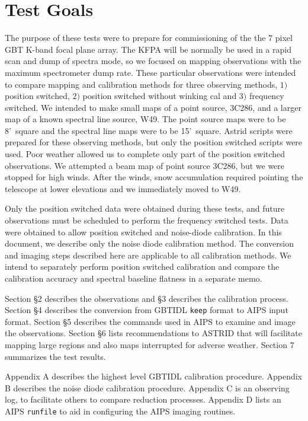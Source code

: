 \documentclass[12pt,twoside]{article}
\newcommand{\arcm}{'~}
\begin{document}
\section{Test Goals}
The purpose of these tests were to prepare for commissioning of the the 7 pixel GBT
K-band focal plane array.   The KFPA will be normally be used in a rapid scan and 
dump of spectra mode, so we focused on mapping observations 
with the maximum spectrometer
dump rate.
These particular observations were intended to compare mapping and calibration 
methods for three observing methods, $1)$ position switched,
$2)$ position switched without winking cal and
$3)$ frequency switched.
We intended to make small maps of a point source, 3C286, and a larger map
of a known spectral line source, W49.   The point source maps were to be
8\arcm square and the spectral line maps were to be 15\arcm square.
Astrid scripts were prepared for these observing methods, but only
the position switched scripts were used. 
Poor weather allowed us to complete only part of the position switched observations.
We attempted a beam map of point source 3C286, 
but we were stopped for high winds.   After the winds,
snow accumulation required pointing the telescope
at lower elevations and we immediately moved to W49.

Only the position switched data were obtained during these tests, and future observations
must be scheduled to perform the frequency switched tests.
Data were obtained to allow position switched and noise-diode calibration.
In this document, we describe only the noise diode calibration method.
The conversion and imaging steps described here are applicable to all
calibration methods.
We intend to separately perform position switched calibration and compare
the calibration accuracy and spectral baseline flatness in a separate memo.

Section \S 2 describes the observations and \S 3 describes the calibration process.
Section \S 4 describes the conversion from GBTIDL {\tt keep} format to AIPS input
format. 
Section \S 5 describes the commands used in AIPS to examine and image the
observations.   Section \S 6 lists recommendations to ASTRID that will facilitate
mapping large regions and also maps interrupted for adverse weather.
Section 7 summarizes the test results.

Appendix A describes the highest level GBTIDL calibration procedure.   Appendix
B describes the noise diode calibration procedure.  Appendix C is an observing
log, to facilitate others to compare reduction processes.
Appendix D lists an AIPS {\tt runfile} to aid in configuring the AIPS imaging routines.
\end{document}
